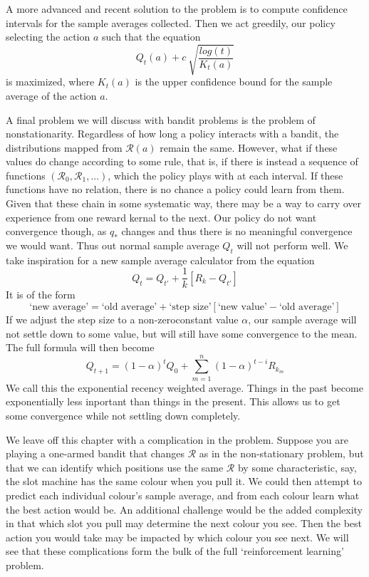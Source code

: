 \documentclass{report}
\begin{document}
A more advanced and recent solution to the problem is to compute confidence intervals for the sample averages collected. Then we act greedily, our policy selecting the action $a$ such that the equation
%
\[ Q_t(a) + c\ \sqrt{\frac{log(t)}{K_t(a)}} \]
%
is maximized, where $K_t(a)$ is the upper confidence bound for the sample average of the action $a$.

A final problem we will discuss with bandit problems is the problem of nonstationarity. Regardless of how long a policy interacts with a bandit, the distributions mapped from $\mathcal{R}(a)$ remain the same. However, what if these values do change according to some rule, that is, if there is instead a sequence of functions $(\mathcal{R}_0, \mathcal{R}_1, \dots)$, which the policy plays with at each interval. If these functions have no relation, there is no chance a policy could learn from them. Given that these chain in some systematic way, there may be a way to carry over experience from one reward kernal to the next. Our policy do not want convergence though, as $q_*$ changes and thus there is no meaningful convergence we would want. Thus out normal sample average $Q_t$ will not perform well. We take inspiration for a new sample average calculator from the equation
%
\[ Q_t = Q_{t'} + \frac{1}{k}[R_{k} - Q_{t'}] \]
%
It is of the form
%
\[ \text{`new average'} = \text{`old average'} + \text{`step size'}[\text{`new value'} - \text{`old average'}] \]
%
If we adjust the step size to a non-zeroconstant value $\alpha$, our sample average will not settle down to some value, but will still have some convergence to the mean. The full formula will then become
%
\[ Q_{t+1} = (1 - \alpha)^t Q_0 + \sum_{m=1}^n (1 - \alpha)^{t-i}R_{k_m} \]
%
We call this the exponential recency weighted average. Things in the past become exponentially less inportant than things in the present. This allows us to get some convergence while not settling down completely.

We leave off this chapter with a complication in the problem. Suppose you are playing a one-armed bandit that changes $\mathcal{R}$ as in the non-stationary problem, but that we can identify which positions use the same $\mathcal{R}$ by some characteristic, say, the slot machine has the same colour when you pull it. We could then attempt to predict each individual colour's sample average, and from each colour learn what the best action would be. An additional challenge would be the added complexity in that which slot you pull may determine the next colour you see. Then the best action you would take may be impacted by which colour you see next. We will see that these complications form the bulk of the full `reinforcement learning' problem.
\end{document}
